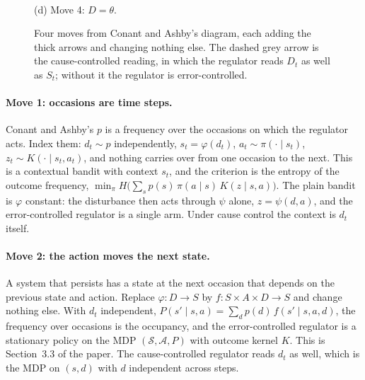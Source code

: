 \documentclass[10pt]{article}
\theoremstyle{plain}
\newcommand{\Scal}{\mathcal S}
\newcommand{\Acal}{\mathcal A}
\begin{document}
\begin{figure}[t]
\begin{minipage}{0.48\textwidth}
\end{minipage}\hfill
\begin{minipage}{0.48\textwidth}\centering
{}\\[1mm]
{\small (d) Move 4: $D = \theta$.}
\end{minipage}
\caption{Four moves from Conant and Ashby's diagram, each adding the thick arrows and changing nothing else.
The dashed grey arrow is the cause-controlled reading, in which the regulator reads $D_t$ as well as $S_t$; without it the regulator is error-controlled.}
\label{fig:moves}
\end{figure}

\paragraph{Move 1: occasions are time steps.}
Conant and Ashby's $p$ is a frequency over the occasions on which the regulator acts.
Index them: $d_t \sim p$ independently, $s_t = \varphi(d_t)$, $a_t \sim \pi(\cdot \mid s_t)$, $z_t \sim K(\cdot \mid s_t,a_t)$, and nothing carries over from one occasion to the next.
This is a contextual bandit with context $s_t$, and the criterion is the entropy of the outcome frequency, $\min_\pi H\big(\sum_s p(s)\,\pi(a \mid s)\,K(z \mid s,a)\big)$.
The plain bandit is $\varphi$ constant: the disturbance then acts through $\psi$ alone, $z = \psi(d,a)$, and the error-controlled regulator is a single arm.
Under cause control the context is $d_t$ itself.

\paragraph{Move 2: the action moves the next state.}
A system that persists has a state at the next occasion that depends on the previous state and action.
Replace $\varphi\colon D \to S$ by $f\colon S \times A \times D \to S$ and change nothing else.
With $d_t$ independent, $P(s' \mid s,a) = \sum_d p(d)\, f(s' \mid s,a,d)$, the frequency over occasions is the occupancy, and the error-controlled regulator is a stationary policy on the MDP $(\Scal,\Acal,P)$ with outcome kernel $K$.
This is Section~3.3 of the paper.
The cause-controlled regulator reads $d_t$ as well, which is the MDP on $(s,d)$ with $d$ independent across steps.
\end{document}
